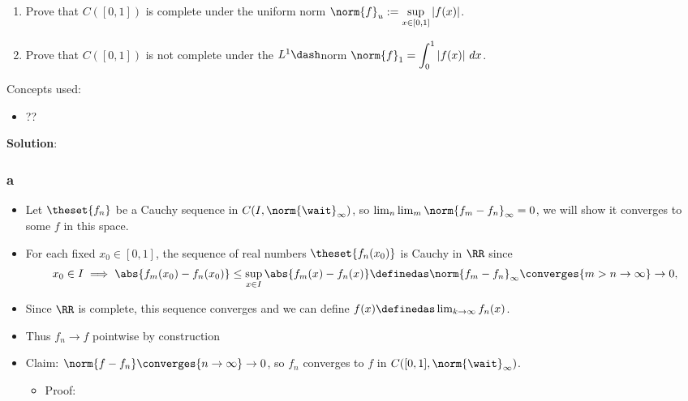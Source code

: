 \begin{enumerate}
\def\labelenumi{\alph{enumi}.}
\item
  Prove that \(C([0, 1])\) is complete under the uniform norm
  \(\norm{f}_u := \displaystyle\sup_{x\in [0,1]} |f (x)|\).
\item
  Prove that \(C([0, 1])\) is not complete under the \(L^1\dash\)norm
  \(\norm{f}_1 = \displaystyle\int_0^1 |f (x)| ~dx\).
\end{enumerate}

\begin{solution}

Concepts used:

\begin{itemize}
\tightlist
\item
  ??
\end{itemize}

\textbf{Solution}:

\hypertarget{a-23}{%
\subsubsection{a}\label{a-23}}

\begin{itemize}
\item
  Let \(\theset{f_n}\) be a Cauchy sequence in
  \(C(I, \norm{\wait}_\infty)\), so
  \(\lim_n\lim_m \norm{f_m - f_n}_\infty = 0\), we will show it
  converges to some \(f\) in this space.
\item
  For each fixed \(x_0 \in [0, 1]\), the sequence of real numbers
  \(\theset{f_n(x_0)}\) is Cauchy in \(\RR\) since
  \begin{align*}
  x_0\in I \implies \abs{f_m(x_0) - f_n(x_0)} \leq \sup_{x\in I} \abs{f_m(x) - f_n(x)} \definedas \norm{f_m - f_n}_\infty \converges{m>n\to\infty}\to 0,
  \end{align*}
\item
  Since \(\RR\) is complete, this sequence converges and we can define
  \(f(x) \definedas \lim_{k\to \infty} f_n(x)\).
\item
  Thus \(f_n\to f\) pointwise by construction
\item
  Claim: \(\norm{f - f_n} \converges{n\to\infty}\to 0\), so \(f_n\)
  converges to \(f\) in \(C([0, 1], \norm{\wait}_\infty)\).

  \begin{itemize}
  \tightlist
  \item
    Proof:


\end{itemize}
\end{itemize}
\end{solution}
